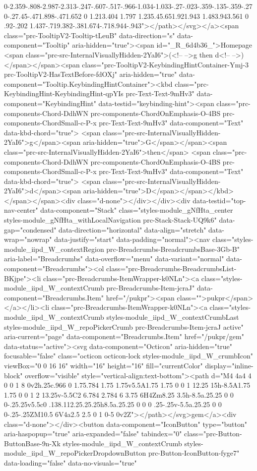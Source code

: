 0-2.359-.808-2.987-2.313-.247-.607-.517-.966-1.034-1.033-.27-.023-.359-.135-.359-.27 0-.27.45-.471.898-.471.652 0 1.213.404 1.797 1.235.45.651.921.943 1.483.943.561 0 .92-.202 1.437-.719.382-.381.674-.718.944-.943"></path></svg></a><span class="prc-TooltipV2-Tooltip-tLeuB" data-direction="s" data-component="Tooltip" aria-hidden="true"><span id="_R_6d4b36_">Homepage <span class="prc-src-InternalVisuallyHidden-2YaI6">(<!-- -->g then d<!-- -->)</span></span><span class="prc-TooltipV2-KeybindingHintContainer-Ymj-3 prc-TooltipV2-HasTextBefore-fdOXj" aria-hidden="true" data-component="Tooltip.KeybindingHintContainer"><kbd class="prc-KeybindingHint-KeybindingHint-qpYIs prc-Text-Text-9mHv3" data-component="KeybindingHint" data-testid="keybinding-hint"><span class="prc-components-Chord-DdhWN prc-components-ChordOnEmphasis-O-4BS prc-components-ChordSmall-c-P-x prc-Text-Text-9mHv3" data-component="Text" data-kbd-chord="true"> <span class="prc-src-InternalVisuallyHidden-2YaI6">g</span><span aria-hidden="true">G</span></span><span class="prc-src-InternalVisuallyHidden-2YaI6">then</span> <span class="prc-components-Chord-DdhWN prc-components-ChordOnEmphasis-O-4BS prc-components-ChordSmall-c-P-x prc-Text-Text-9mHv3" data-component="Text" data-kbd-chord="true"> <span class="prc-src-InternalVisuallyHidden-2YaI6">d</span><span aria-hidden="true">D</span></span></kbd></span></span><div class="d-none"></div></div><div data-testid="top-nav-center" data-component="Stack" class="styles-module_gNfHta_center styles-module_gNfHta_withLocalNavigation prc-Stack-Stack-UQ9k6" data-gap="condensed" data-direction="horizontal" data-align="stretch" data-wrap="nowrap" data-justify="start" data-padding="normal"><nav class="styles-module_iipd_W_contextRegion prc-Breadcrumbs-BreadcrumbsBase-3Gb-B" aria-label="Breadcrumbs" data-overflow="menu" data-variant="normal" data-component="Breadcrumbs"><ol class="prc-Breadcrumbs-BreadcrumbsList-BKjpe"><li class="prc-Breadcrumbs-ItemWrapper-k0NLn"><a class="styles-module_iipd_W_contextCrumb prc-Breadcrumbs-Item-jcraJ" data-component="Breadcrumbs.Item" href="/pukpr"><span class="">pukpr</span></a></li><li class="prc-Breadcrumbs-ItemWrapper-k0NLn"><a class="styles-module_iipd_W_contextCrumb styles-module_iipd_W_contextCrumbLast styles-module_iipd_W_repoPickerCrumb prc-Breadcrumbs-Item-jcraJ active" aria-current="page" data-component="Breadcrumbs.Item" href="/pukpr/gem" data-status="active"><svg data-component="Octicon" aria-hidden="true" focusable="false" class="octicon octicon-lock styles-module_iipd_W_crumbIcon" viewBox="0 0 16 16" width="16" height="16" fill="currentColor" display="inline-block" overflow="visible" style="vertical-align:text-bottom"><path d="M4 4a4 4 0 0 1 8 0v2h.25c.966 0 1.75.784 1.75 1.75v5.5A1.75 1.75 0 0 1 12.25 15h-8.5A1.75 1.75 0 0 1 2 13.25v-5.5C2 6.784 2.784 6 3.75 6H4Zm8.25 3.5h-8.5a.25.25 0 0 0-.25.25v5.5c0 .138.112.25.25.25h8.5a.25.25 0 0 0 .25-.25v-5.5a.25.25 0 0 0-.25-.25ZM10.5 6V4a2.5 2.5 0 1 0-5 0v2Z"></path></svg>gem</a><div class="d-none"></div><button data-component="IconButton" type="button" aria-haspopup="true" aria-expanded="false" tabindex="0" class="prc-Button-ButtonBase-9n-Xk styles-module_iipd_W_contextCrumb styles-module_iipd_W_repoPickerDropdownButton prc-Button-IconButton-fyge7" data-loading="false" data-no-visuals="true" 